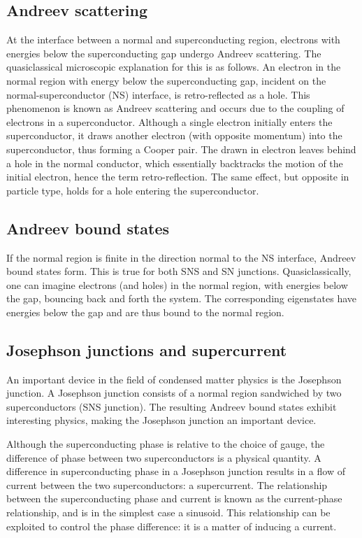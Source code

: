     \subsection{Andreev scattering}
        At the interface between a normal and superconducting region, electrons with energies below the superconducting gap undergo Andreev scattering.
        The quasiclassical microscopic explanation for this is as follows.
        An electron in the normal region with energy below the superconducting gap, incident on the normal-superconductor (NS) interface, is retro-reflected as a hole.
        This phenomenon is known as Andreev scattering and occurs due to the coupling of electrons in a superconductor.
        Although a single electron initially enters the superconductor, it draws another electron (with opposite momentum) into the superconductor, thus forming a Cooper pair.
        The drawn in electron leaves behind a hole in the normal conductor, which essentially backtracks the motion of the initial electron, hence the term retro-reflection.
        The same effect, but opposite in particle type, holds for a hole entering the superconductor.

    \subsection{Andreev bound states}
        If the normal region is finite in the direction normal to the NS interface, Andreev bound states form.
        This is true for both SNS and SN junctions.
        Quasiclassically, one can imagine electrons (and holes) in the normal region, with energies below the gap, bouncing back and forth the system.
        The corresponding eigenstates have energies below the gap and are thus bound to the normal region.

    \subsection{Josephson junctions and supercurrent}
        An important device in the field of condensed matter physics is the Josephson junction.
        A Josephson junction consists of a normal region sandwiched by two superconductors (SNS junction).
        The resulting Andreev bound states exhibit interesting physics, making the Josephson junction an important device.

        Although the superconducting phase is relative to the choice of gauge, the difference of phase between two superconductors is a physical quantity.
        A difference in superconducting phase in a Josephson junction results in a flow of current between the two superconductors: a supercurrent.
        The relationship between the superconducting phase and current is known as the current-phase relationship, and is in the simplest case a sinusoid.
        This relationship can be exploited to control the phase difference: it is a matter of inducing a current.

